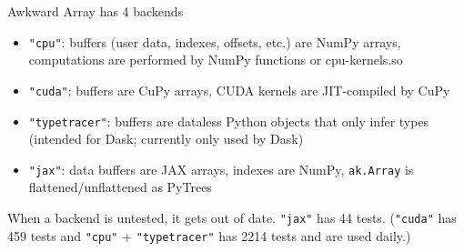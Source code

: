 \documentclass[aspectratio=169]{beamer}
\begin{document}
\begin{frame}{Awkward Array has 4 backends}
\large
\vspace{0.5 cm}
\begin{itemize}\setlength{\itemsep}{0.5 cm}
\item \texttt{"cpu"}: buffers (user data, indexes, offsets, etc.) are NumPy arrays, computations are performed by NumPy functions or cpu-kernels.so
\item \texttt{"cuda"}: buffers are CuPy arrays, CUDA kernels are JIT-compiled by CuPy
\item \texttt{"typetracer"}: buffers are dataless Python objects that only infer types (intended for Dask; currently only used by Dask)
\item \texttt{"jax"}: data buffers are JAX arrays, indexes are NumPy, \texttt{ak.Array} is flattened/unflattened as PyTrees
\end{itemize}

\vspace{0.5 cm}
When a backend is untested, it gets out of date. \texttt{"jax"} has 44 tests. (\texttt{"cuda"} has 459 tests and \texttt{"cpu"} + \texttt{"typetracer"} has 2214 tests and are used daily.)
\end{frame}
\end{document}
